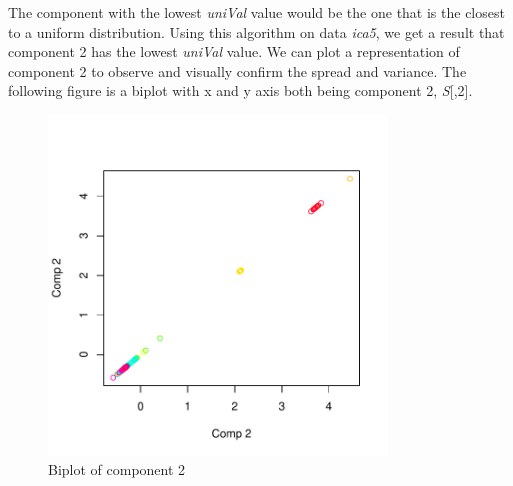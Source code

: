 The component with the lowest \emph{uniVal} value would be the one that is the closest to a uniform distribution. Using this algorithm on data \emph{ica5}, we get a result that component 2 has the lowest \emph{uniVal} value. We can plot a representation of component 2 to observe and visually confirm the spread and variance. The following figure is a biplot with x and y axis both being component 2, \emph{S}[,2].
\begin{figure}[H]
    \centering
    \includegraphics[width=9cm]{images/ICA/[5]/comp 2.pdf}  
    \caption{Biplot of component 2}
    \label{fig:[5]comp2} 
\end{figure}

